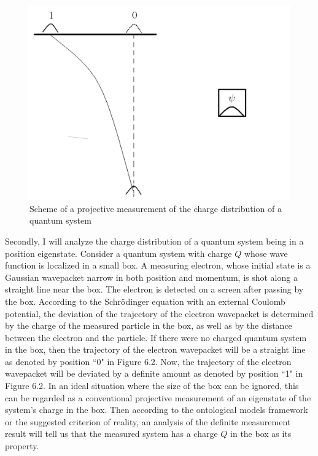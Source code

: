 \begin{center}
\begin{figure}[h]\label{pmc}

\includegraphics[scale=0.39]{fig62.jpg}


\caption{Scheme of a projective measurement of the charge distribution of a quantum system}

\end{figure} 
\end{center} 

\vspace{2mm}

Secondly, I will analyze the charge distribution of a quantum system being in a  position eigenstate.  
Consider a quantum system with charge $Q$ whose wave function is localized in a small box. A measuring electron, whose initial state is a Gaussian wavepacket narrow in both position and momentum, is shot along a straight line near the box. The electron is detected on a screen after passing by the box. 
According to the Schr\"{o}dinger equation with an external Coulomb potential, the deviation of the trajectory of the electron wavepacket is determined by the charge of the measured particle in the box, as well as by the distance between the electron and the particle. 
If there were no charged quantum system in the box, then the trajectory of the electron wavepacket will be a straight line as denoted by position ``0" in Figure 6.2. Now, the trajectory of the electron wavepacket will be deviated by a definite amount as denoted by position ``1" in Figure 6.2. 
In an ideal situation where the size of the box can be ignored, this can be regarded as a conventional projective measurement of an eigenstate of the system's charge in the box. 
Then according to the ontological models framework or the suggested criterion of reality, an analysis of the definite measurement result will tell us that the measured system has a charge $Q$ in the box as its property.

